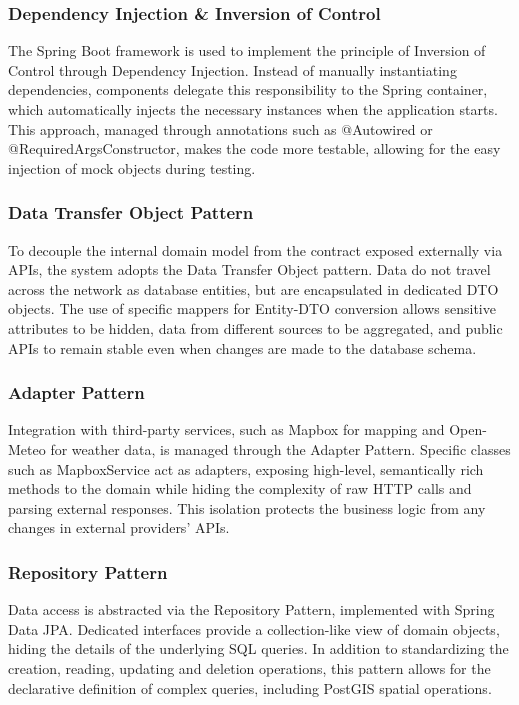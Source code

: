 \subsubsection{Dependency Injection \& Inversion of Control}
The Spring Boot framework is used to implement the principle of Inversion of Control through Dependency Injection. Instead of manually instantiating dependencies, components delegate this responsibility to the Spring container, which automatically injects the necessary instances when the application starts. This approach, managed through annotations such as @Autowired or @RequiredArgsConstructor, makes the code more testable, allowing for the easy injection of mock objects during testing.

\subsubsection{Data Transfer Object Pattern}
To decouple the internal domain model from the contract exposed externally via APIs, the system adopts the Data Transfer Object pattern. Data do not travel across the network as database entities, but are encapsulated in dedicated DTO objects. The use of specific mappers for Entity-DTO conversion allows sensitive attributes to be hidden, data from different sources to be aggregated, and public APIs to remain stable even when changes are made to the database schema.

\subsubsection{Adapter Pattern}
Integration with third-party services, such as Mapbox for mapping and Open-Meteo for weather data, is managed through the Adapter Pattern. Specific classes such as MapboxService act as adapters, exposing high-level, semantically rich methods to the domain while hiding the complexity of raw HTTP calls and parsing external responses. This isolation protects the business logic from any changes in external providers' APIs.

\subsubsection{Repository Pattern}
Data access is abstracted via the Repository Pattern, implemented with Spring Data JPA. Dedicated interfaces provide a collection-like view of domain objects, hiding the details of the underlying SQL queries. In addition to standardizing the creation, reading, updating and deletion operations, this pattern allows for the declarative definition of complex queries, including PostGIS spatial operations.

